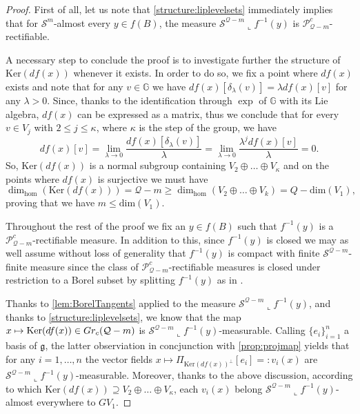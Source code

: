 \documentclass[10pt, a4paper,
oneside, headinclude,footinclude]{scrartcl}
\begin{document}
\begin{proof}
First of all, let us note that \cref{structure:liplevelsets} immediately implies that for $\mathcal{S}^m$-almost every $y\in f(B)$, the measure $\mathcal{S}^{\mathcal{Q}-m}\llcorner f^{-1}(y)$ is $\mathscr{P}^c_{\mathcal{Q}-m}$-rectifiable. 

A necessary step to conclude the proof is to investigate further the structure of $\mathrm{Ker}(df(x))$ whenever it exists. In order to do so, we fix a point where $df(x)$ exists and note that for any $v\in\mathbb{G}$ we have $df(x)[\delta_\lambda(v)]=\lambda df(x)[v]$ for any $\lambda>0$. Since, thanks to the identification through $\exp$ of $\mathbb{G}$ with its Lie algebra, $df(x)$ can be expressed as a matrix, thus we conclude that for every $v\in V_j$ with $2\leq j\leq \kappa$, where $\kappa$ is the step of the group, we have
$$ 
df(x)[v]=\lim_{\lambda\to 0}\frac{df(x)[\delta_\lambda(v)]}{\lambda}=\lim_{\lambda\to 0}\frac{\lambda^j df(x)[v]}{\lambda}=0.
$$
So, $\mathrm{Ker}(df(x))$ is a normal subgroup containing $V_2\oplus\ldots\oplus V_\kappa$ and on the points where $df(x)$ is surjective we must have 
$$
\dim_{\mathrm{hom}}(\mathrm{Ker}(df(x)))=\mathcal{Q}-m\geq\dim_{\mathrm{hom}}(V_2\oplus\ldots\oplus V_k)=Q-\mathrm{dim}(V_1),
$$
proving that we have $m\leq \mathrm{dim}(V_1)$.

Throughout the rest of the proof we fix an $y\in f(B)$ such that $f^{-1}(y)$ is a $\mathscr{P}^c_{\mathcal{Q}-m}$-rectifiable measure. In addition to this, since $f^{-1}(y)$ is closed we may as well assume without loss of generality that $f^{-1}(y)$ is compact with finite $\mathcal{S}^{\mathcal{Q}-m}$-finite measure since the class of $\mathscr{P}^c_{\mathcal{Q}-m}$-rectifiable measures is closed under restriction to a Borel subset by splitting $f^{-1}(y)$ as in \cite[Proposition 2.4, Proposition 2.5 and Proposition 2.6]{antonelli2020rectifiable}. 



Thanks to \cref{lem:BorelTangents} applied to the measure $\mathcal{S}^{\mathcal{Q}-m}\llcorner f^{-1}(y)$, and thanks to \cref{structure:liplevelsets}, we know that the map $x\mapsto \mathrm{Ker}(df(x))\in Gr_c(\mathcal{Q}-m)$ is $\mathcal{S}^{\mathcal{Q}-m}\llcorner f^{-1}(y)$-measurable. Calling $\{e_i\}_{i=1}^n$ a basis of $\mathfrak g$, the latter observiation in concjunction with \cref{prop:projmap} yields that for any $i=1,\ldots,n$ the vector fields $x\mapsto\Pi_{\mathrm{Ker}(df(x))^\perp}[e_i]=:v_i(x)$ are $\mathcal{S}^{\mathcal{Q}-m}\llcorner f^{-1}(y)$-measurable. Moreover, thanks to the above discussion, according to which $\mathrm{Ker}(df(x))\supseteq V_2\oplus\dots\oplus V_\kappa$, each $v_i(x)$ belong $\mathcal{S}^{\mathcal{Q}-m}\llcorner f^{-1}(y)$-almost everywhere to $GV_1$.


\end{proof}
\end{document}
